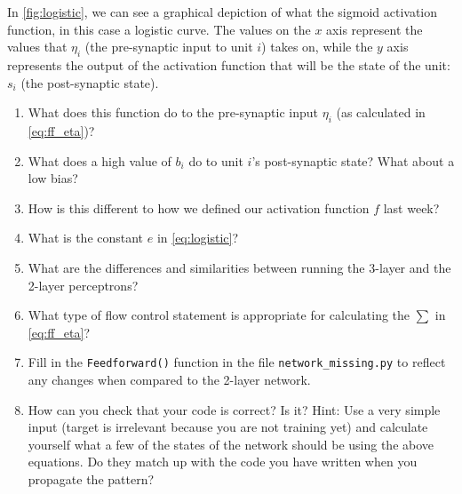 \documentclass[a4paper,10pt]{article}
\begin{document}
In \autoref{fig:logistic}, we can see a graphical depiction of what the sigmoid activation function, in this case a logistic curve. The values on the $x$ axis represent the values that $\eta_i$ (the pre-synaptic input to unit $i$) takes on, while the $y$ axis represents the output of the activation function that will be the state of the unit: $s_i$ (the post-synaptic state).

\begin{enumerate}
 \item What does this function do to the pre-synaptic input $\eta_i$ (as calculated in \autoref{eq:ff_eta})?

\item What does a high value of $b_i$ do to unit $i$'s post-synaptic state? What about a low bias? 
 
 \item How is this different to how we defined our activation function $f$ last week?
 
 \item What is the constant $e$ in \autoref{eq:logistic}? 
 
 \item What are the differences and similarities between running the 3-layer and the 2-layer perceptrons? 
 
 \item What type of flow control statement is appropriate for calculating the $\sum$ in \autoref{eq:ff_eta}?

 
 \item Fill in the \texttt{Feedforward()} function in the file \texttt{network\_missing.py} to reflect any changes when compared to the 2-layer network. 
 
 
 \item How can you check that your code is correct? Is it?  Hint: Use a very simple input (target is irrelevant because you are not training yet) and calculate yourself what a few of the states of the network should be using the above equations. Do they match up with the code you have written when you propagate the pattern? 
 
\end{enumerate}
\end{document}
